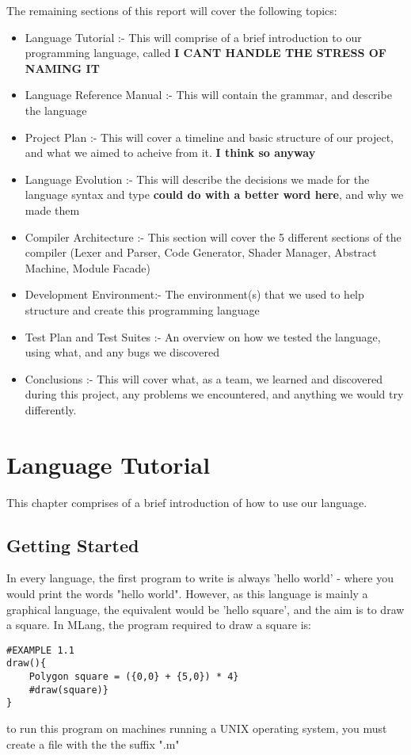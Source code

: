 \documentclass{l3proj}
\begin{document}
The remaining sections of this report will cover the following topics:
\begin{itemize}
\item Language Tutorial :- This will comprise of a brief introduction to our programming language, called \textbf{I CANT HANDLE THE STRESS OF NAMING IT}
\item Language Reference Manual :- This will contain the grammar, and describe the language
\item Project Plan :- This will cover a timeline and basic structure of our project, and what we aimed to acheive from it. \textbf{I think so anyway}
\item Language Evolution :- This will describe the decisions we made for the language syntax and type \textbf{could do with a better word here}, and why we made them
\item Compiler Architecture :- This section will cover the 5 different sections of the compiler (Lexer and Parser, Code Generator, Shader Manager, Abstract Machine, Module Facade)
\item Development Environment:- The environment(s) that we used to help structure and create this programming language
\item Test Plan and Test Suites :- An overview on how we tested the language, using what, and any bugs we discovered
\item Conclusions :- This will cover what, as a team, we learned and discovered during this project, any problems we encountered, and anything we would try differently.
\end{itemize}

\chapter{Language Tutorial}
\label{tut}
This chapter comprises of a brief introduction of how to use our language.
\section{Getting Started}
\label{start}
In every language, the first program to write is always 'hello world' - where you would print the words "hello world". However, as this language is mainly a graphical language, the equivalent would be 'hello square', and the aim is to draw a square. In MLang, the program required to draw a square is:\\
\begin{lstlisting}
#EXAMPLE 1.1
draw(){
	Polygon square = ({0,0} + {5,0}) * 4}
	#draw(square)}
}
\end{lstlisting}
to run this program on machines running a UNIX operating system, you must create a file with the the suffix ".m"
\end{document}
